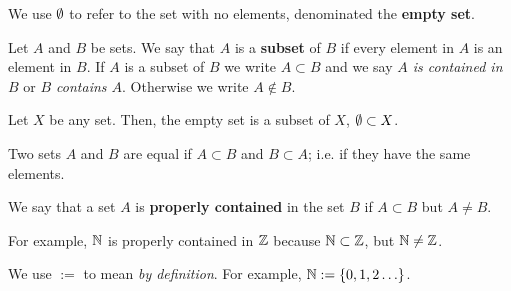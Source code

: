 
\begin{defi}
    We use $\emptyset$ to refer to the set with no elements, denominated the \textbf{empty set}.
\end{defi}

\begin{defi}[Subset]
    Let $A$ and $B$ be sets. We say that $A$ is a \textbf{subset} of $B$ if every element in $A$ is an element in $B$. If $A$ is a subset of $B$ we write $A\subset B$ and we say \textit{$A$ is contained in $B$} or \textit{$B$ contains $A$}. Otherwise we write $A\notin B$.
\end{defi}

\begin{remark}
    Let $X$ be any set. Then, the empty set is a subset of $X$, $\emptyset\subset X$.
\end{remark}


\begin{defi}
    Two sets $A$ and $B$ are equal if $A \subset B$ and $B\subset A$; i.e. if they have the same elements.
\end{defi}

\begin{defi}
    We say that a set $A$ is \textbf{properly contained} in the set $B$ if $A\subset B$ but $A\neq B$.
\end{defi}

For example, $\mathbb{N}$ is properly contained in $\mathbb{Z}$ because $\mathbb{N}\subset\mathbb{Z}$, but $\mathbb{N}\neq\mathbb{Z}$.

\begin{notation}
    We use $:=$ to mean \textit{by definition}. For example, $\mathbb{N} := \{0, 1, 2\ldots\} $.
\end{notation}

